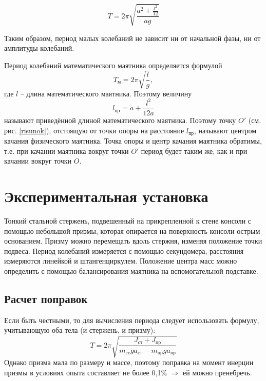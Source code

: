 \documentclass[a4paper,12pt]{article}
\begin{document}
 	\begin{equation}\label{time_a}
 		T=2\pi\sqrt{\frac{a^2+\frac{l^2}{12}}{ag}}
 	\end{equation}
 	
 	Таким образом, период малых колебаний не зависит ни от начальной фазы, ни от амплитуды колебаний.
 	\medspace
 	
 	Период колебаний математического маятника определяется формулой
 	\begin{equation}
 		T_\text{м}=2\pi\sqrt{\frac{l}{g}},
 	\end{equation}
 	где $ l $ -- длина математического маятника. Поэтому величину
 	\begin{equation}\label{prived}
 		l_\text{пр}=a+\frac{l^2}{12a}
 	\end{equation}
 	называют приведённой длиной математического маятника. Поэтому точку $ O' $ (см. рис. \ref{risunok}), отстоящую от точки опоры на расстояние $ l_\text{пр} $, называют центром качания физического маятника. Точка опоры и центр качания маятника обратимы, т.е. при качании маятника вокруг  точки $ O' $ период будет таким же, как и при качании вокруг точки $ O $.
 	
 	\section {Экспериментальная установка}
 	Тонкий стальной стержень, подвешенный на прикрепленной к стене консоли с помощью небольшой призмы, которая опирается на поверхность консоли острым основанием. Призму можно перемещать вдоль стержня, изменяя положение точки подвеса. Период колебаний измеряется с помощью секундомера, расстояния измеряются линейкой и штангенциркулем. Положение центра масс можно определить с помощью балансирования маятника на вспомогательной подставке.
 	
 	
 	
 	\subsection{Расчет поправок}
 	Если быть честными, то для вычисления периода следует использовать формулу, учитывающую оба тела (и стержень, и призму):
 	\begin{equation}
 		T = 2\pi\sqrt{\frac{J_\text{ст} + J_\text{пр}}{m_\text{ст}ga_\text{ст}-m_\text{пр}ga_\text{пр}}}
 	\end{equation}
 	Однако призма мала по размеру и массе, поэтому поправка на момент инерции призмы в условиях опыта составляет не более 0,1\% $\Rightarrow$ ей можно пренебречь.
 	
\end{document}
